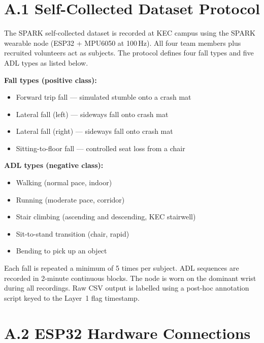 
\section*{A.1 \quad Self-Collected Dataset Protocol}

The SPARK self-collected dataset is recorded at KEC campus using the SPARK wearable node (ESP32 + MPU6050 at 100\,Hz). All four team members plus recruited volunteers act as subjects. The protocol defines four fall types and five ADL types as listed below.

\textbf{Fall types (positive class):}
\begin{itemize}
    \item Forward trip fall --- simulated stumble onto a crash mat
    \item Lateral fall (left) --- sideways fall onto crash mat
    \item Lateral fall (right) --- sideways fall onto crash mat
    \item Sitting-to-floor fall --- controlled seat loss from a chair
\end{itemize}

\textbf{ADL types (negative class):}
\begin{itemize}
    \item Walking (normal pace, indoor)
    \item Running (moderate pace, corridor)
    \item Stair climbing (ascending and descending, KEC stairwell)
    \item Sit-to-stand transition (chair, rapid)
    \item Bending to pick up an object
\end{itemize}

Each fall is repeated a minimum of 5 times per subject. ADL sequences are recorded in 2-minute continuous blocks. The node is worn on the dominant wrist during all recordings. Raw CSV output is labelled using a post-hoc annotation script keyed to the Layer~1 flag timestamp.

\section*{A.2 \quad ESP32 Hardware Connections}

